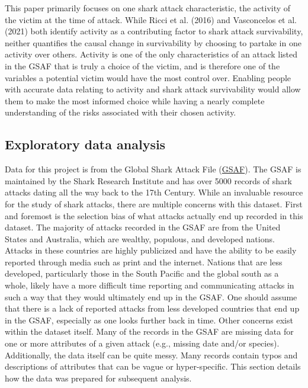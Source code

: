 \documentclass[
  letterpaper,
  DIV=11,
  numbers=noendperiod]{scrartcl}
\begin{document}
This paper primarily focuses on one shark attack characteristic, the
activity of the victim at the time of attack. While Ricci et al. (2016)
and Vasconcelos et al. (2021) both identify activity as a contributing
factor to shark attack survivability, neither quantifies the causal
change in survivability by choosing to partake in one activity over
others. Activity is one of the only characteristics of an attack listed
in the GSAF that is truly a choice of the victim, and is therefore one
of the variables a potential victim would have the most control over.
Enabling people with accurate data relating to activity and shark attack
survivability would allow them to make the most informed choice while
having a nearly complete understanding of the risks associated with
their chosen activity.

\subsection{Exploratory data analysis}\label{sec-2}

Data for this project is from the Global Shark Attack File
(\href{https://www.sharkattackfile.net/incidentlog.htm}{GSAF}). The GSAF
is maintained by the Shark Research Institute and has over 5000 records
of shark attacks dating all the way back to the 17th Century. While an
invaluable resource for the study of shark attacks, there are multiple
concerns with this dataset. First and foremost is the selection bias of
what attacks actually end up recorded in this dataset. The majority of
attacks recorded in the GSAF are from the United States and Australia,
which are wealthy, populous, and developed nations. Attacks in these
countries are highly publicized and have the ability to be easily
reported through media such as print and the internet. Nations that are
less developed, particularly those in the South Pacific and the global
south as a whole, likely have a more difficult time reporting and
communicating attacks in such a way that they would ultimately end up in
the GSAF. One should assume that there is a lack of reported attacks
from less developed countries that end up in the GSAF, especially as one
looks further back in time. Other concerns exist within the dataset
itself. Many of the records in the GSAF are missing data for one or more
attributes of a given attack (e.g., missing date and/or species).
Additionally, the data itself can be quite messy. Many records contain
typos and descriptions of attributes that can be vague or
hyper-specific. This section details how the data was prepared for
subsequent analysis.
\end{document}
